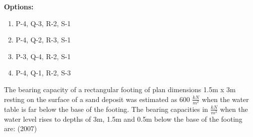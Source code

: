   \textbf{Options:}
  
  \begin{enumerate}[label=\Alph*]
      \item P-4, Q-3, R-2, S-1
      \item P-4, Q-2, R-3, S-1
      \item P-3, Q-4, R-2, S-1
      \item P-4, Q-1, R-2, S-3
  \end{enumerate}
  \item  The bearing capacity of a rectangular footing of plan dimensions 1.5m x 3m resting on the surface of a sand deposit was estimated as 600 $\frac{kN}{m^2}$ when the water table is far below the base of the footing. The bearing capacities in $\frac{kN}{m^2}$ when the water level rises to depths of 3m, 1.5m and 0.5m below the base of the footing\\ are: \hfill (2007)

